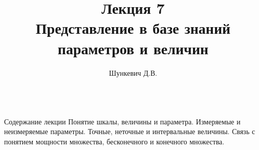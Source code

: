 \title{Лекция 7\\Представление в базе знаний параметров и величин}   
\author[]{Шункевич Д.В.}

\begin{frame}
	\titlepage
\end{frame}

\begin{frame}{\\Содержание лекции}
	\topline
	\justifying
	Понятие шкалы, величины и параметра. Измеряемые и неизмеряемые параметры. Точные, неточные и интервальные величины. Связь с понятием мощности множества, бесконечного и конечного множества.
\end{frame}